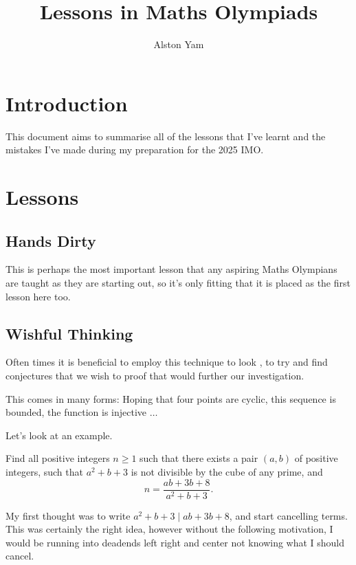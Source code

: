 \documentclass{article}
\title{Lessons in Maths Olympiads}
\author{Alston Yam}
\theoremstyle{mytheoremstyle}
\theoremstyle{mytheoremstyle}
\theoremstyle{myproblemstyle}
\theoremstyle{myproblemstyle}
\begin{document}
    \maketitle
    \tableofcontents
    \pagebreak
    
    \section{Introduction}
    This document aims to summarise all of the lessons that I've learnt and the mistakes I've made during my preparation for the 2025 IMO.

    \section{Lessons}
    \subsection{Hands Dirty}
    This is perhaps the most important lesson that any aspiring Maths Olympians are taught as they are starting out, so it's only fitting that it is placed as the first lesson here too.

    \subsection{Wishful Thinking}
    \vspace{3pt}
    \begin{center}
    \end{center}

    Often times it is beneficial to employ this technique to look , to try and find conjectures that we wish to proof that would further our investigation.

    This comes in many forms: Hoping that four points are cyclic, this sequence is bounded, the function is injective $\dots$

    Let's look at an example.

    \begin{example}[2021 ISL N1]
        Find all positive integers $n\geq1$ such that there exists a pair $(a,b)$ of positive integers, such that $a^2+b+3$ is not divisible by the cube of any prime, and \[ n=\frac{ab+3b+8}{a^2+b+3}. \]
    \end{example}

    My first thought was to write $a^2 + b + 3 \mid ab + 3b + 8$, and start cancelling terms. This was certainly the right idea, however without the following motivation, I would be running into deadends left right and center not knowing what I should cancel.
    
\end{document}
